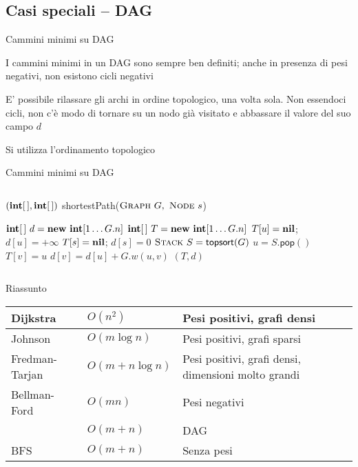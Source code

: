 \subsection{Casi speciali -- DAG}

\begin{frame}{Cammini minimi su DAG}

\BIL
\item I cammini minimi in un DAG sono sempre ben definiti; anche in presenza di
pesi negativi, non esistono cicli negativi
\item E' possibile rilassare gli archi in ordine topologico, una volta sola. 
Non essendoci cicli, non c'è modo di tornare su un nodo già visitato e 
abbassare il valore del suo campo $d$
\EIL

\bigskip
{}
\BIL
\item Si utilizza l'ordinamento topologico
\EIL

\end{frame}

\begin{frame}{Cammini minimi su DAG}

\vspace{-24pt}
\begin{columns}
\begin{Procedure}
\caption[A]{$(\INTARRAY, \INTARRAY)$ \textsf{shortestPath}($\textsc{Graph}\ G,\ \textsc{Node}\ s$)}
$\INTEGER[\,]\ d = \NEW\ \INTEGER[1 \mldots G.n]$
$\INTEGER[\,]\ T = \NEW\ \INTEGER[1 \mldots G.n]$
{
  $T[u] = \textbf{nil}$; $d[u] = +\infty$\; 
}
$T[s] = \textbf{nil}$; $d[s] = 0$\; 
$\textsc{Stack}\ S = \textsf{topsort}(G)$\;
{
  $u = S.\textsf{pop}()$\;
  {
    {
      $T[v] = u$\;
      $d[v] = d[u] + G.w(u,v)$\;
    }
  }
}
\Return $(T,d)$
\end{Procedure}
\end{columns}

\end{frame}

\begin{frame}{Riassunto}


\medskip
\begingroup
\renewcommand*{\arraystretch}{1.2}
\begin{tabular}{|l|l|P{5cm}|}
\hline
Dijkstra & $O(n^2)$ & Pesi positivi, grafi densi \\\hline
Johnson & $O(m \log n)$ & Pesi positivi, grafi sparsi \\\hline
Fredman-Tarjan & $O(m + n \log n)$ & Pesi positivi, grafi densi, dimensioni molto grandi  \\\hline
Bellman-Ford & $O(mn)$ & Pesi negativi \\\hline
  & $O(m+n)$ & DAG \\\hline
BFS & $O(m+n)$ & Senza pesi \\\hline
\end{tabular}
\endgroup

\end{frame}


